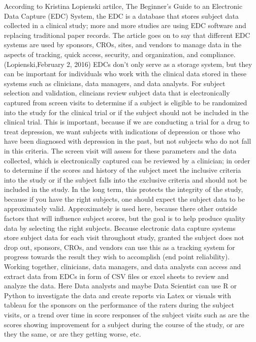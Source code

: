\documentclass[sigconf]{acmart}
\begin{document}
{According to Kristina Lopienski artilce, The Beginner’s Guide to an Electronic Data Capture (EDC) System, the EDC is a database that stores subject data collected in a clinical study; more and more studies are using EDC software and replacing traditional paper records. 
The article goes on to say that different EDC systems are used by sponsors, CROs, sites, and vendors to manage data in the aspects of tracking, quick access, security, and organization, and compliance. (Lopienski,February 2, 2016)
EDCs don't only serve as a storage system, but they can be important for individuals who work with the clinical data stored in these systems such as clinicians, data managers, and data analysts. For subject selection and validation, clincians review subject data that is electronically captured from screen visits to determine if a subject is eligible to be randomized into the study for the clinical trial or if the subject should not be included in the clinical trial. 
This is important, because if we are conducting a trial for a drug to treat depression, we want subjects with indications of depression or those who have been diagnosed with depression in the past, but not subjects who do not fall in this criteria. 
The screen visit will assess for these parameters and the data collected, which is electronically captured can be reviewed by a clinician;
in order to determine if the scores and history of the subject meet the inclusive criteria into the study or if the subject falls into the exclusive criteria and should not be included in the study. In the long term, this protects the integrity of the study, because if you have the right subjects, one should expect the subject data to be approximately valid. Approximately is used here, because there other outside factors that will influence subject scores, but the goal is to help produce quality data by selecting the right subjects.
Because electronic data capture systems store subject data for each visit throughout study, granted the subject does not drop out, sponsors, CROs, and vendors can use this as a tracking system for progress towards the result they wish to accomplish (end point reliability). 
Working together, clinicians, data managers, and data analysts can access and extract data from EDCs in form of CSV files or excel sheets to review and analyze the data.
Here Data analysts and maybe Data Scientist can use R or Python to investigate the data and create reports via Latex or visuals with tableau for the sponsors on the performance of the raters during the subject visits, or a trend over time in score responses of the subject visits such as are the scores showing improvement for a subject during the course of the study, or are they the same, or are they getting worse, etc. 

}
\end{document}
